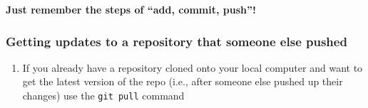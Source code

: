 \documentclass[
  letterpaper,
  DIV=11,
  numbers=noendperiod]{scrartcl}
\providecommand{\tightlist}{%
  \setlength{\itemsep}{0pt}\setlength{\parskip}{0pt}}\usepackage{longtable,booktabs,array}
\begin{document}
\textbf{Just remember the steps of ``add, commit, push''!}

\hypertarget{getting-updates-to-a-repository-that-someone-else-pushed}{%
\subsubsection{Getting updates to a repository that someone else
pushed}\label{getting-updates-to-a-repository-that-someone-else-pushed}}

\begin{enumerate}
\def\labelenumi{\arabic{enumi}.}
\tightlist
\item
  If you already have a repository cloned onto your local computer and
  want to get the latest version of the repo (i.e., after someone else
  pushed up their changes) use the \texttt{git\ pull} command
\end{enumerate}
\end{document}

